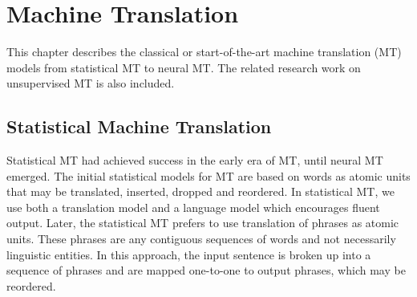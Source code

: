\chapter{Machine Translation}
This chapter describes the classical or start-of-the-art machine translation  (MT) models from statistical MT to neural MT. The related research work on unsupervised MT is also included.


\section{Statistical Machine Translation}
%
%
Statistical MT had achieved success in the early era of MT, until neural MT emerged. The initial statistical models for MT are based on words as atomic units that may be translated, inserted, dropped and reordered. In statistical MT, we use both a translation model and a language model which encourages fluent output. Later, the statistical MT prefers to use translation of phrases as atomic units. These phrases are any contiguous sequences of words and not necessarily linguistic entities. In this approach, the input sentence is broken up into a sequence of phrases and are mapped one-to-one to output phrases, which may be reordered.

